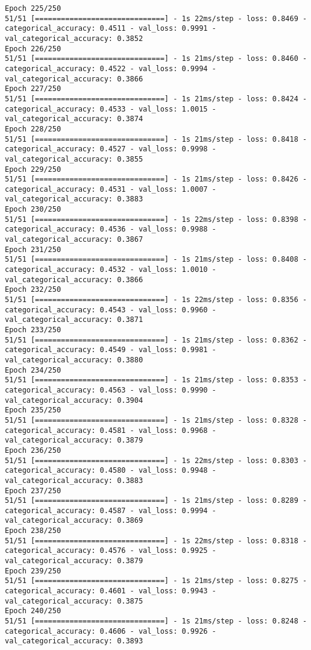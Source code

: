 \begin{lstlisting}
Epoch 225/250
51/51 [==============================] - 1s 22ms/step - loss: 0.8469 - categorical_accuracy: 0.4511 - val_loss: 0.9991 - val_categorical_accuracy: 0.3852
Epoch 226/250
51/51 [==============================] - 1s 21ms/step - loss: 0.8460 - categorical_accuracy: 0.4522 - val_loss: 0.9994 - val_categorical_accuracy: 0.3866
Epoch 227/250
51/51 [==============================] - 1s 21ms/step - loss: 0.8424 - categorical_accuracy: 0.4533 - val_loss: 1.0015 - val_categorical_accuracy: 0.3874
Epoch 228/250
51/51 [==============================] - 1s 21ms/step - loss: 0.8418 - categorical_accuracy: 0.4527 - val_loss: 0.9998 - val_categorical_accuracy: 0.3855
Epoch 229/250
51/51 [==============================] - 1s 21ms/step - loss: 0.8426 - categorical_accuracy: 0.4531 - val_loss: 1.0007 - val_categorical_accuracy: 0.3883
Epoch 230/250
51/51 [==============================] - 1s 22ms/step - loss: 0.8398 - categorical_accuracy: 0.4536 - val_loss: 0.9988 - val_categorical_accuracy: 0.3867
Epoch 231/250
51/51 [==============================] - 1s 21ms/step - loss: 0.8408 - categorical_accuracy: 0.4532 - val_loss: 1.0010 - val_categorical_accuracy: 0.3866
Epoch 232/250
51/51 [==============================] - 1s 22ms/step - loss: 0.8356 - categorical_accuracy: 0.4543 - val_loss: 0.9960 - val_categorical_accuracy: 0.3871
Epoch 233/250
51/51 [==============================] - 1s 21ms/step - loss: 0.8362 - categorical_accuracy: 0.4549 - val_loss: 0.9981 - val_categorical_accuracy: 0.3880
Epoch 234/250
51/51 [==============================] - 1s 21ms/step - loss: 0.8353 - categorical_accuracy: 0.4563 - val_loss: 0.9990 - val_categorical_accuracy: 0.3904
Epoch 235/250
51/51 [==============================] - 1s 21ms/step - loss: 0.8328 - categorical_accuracy: 0.4581 - val_loss: 0.9968 - val_categorical_accuracy: 0.3879
Epoch 236/250
51/51 [==============================] - 1s 22ms/step - loss: 0.8303 - categorical_accuracy: 0.4580 - val_loss: 0.9948 - val_categorical_accuracy: 0.3883
Epoch 237/250
51/51 [==============================] - 1s 21ms/step - loss: 0.8289 - categorical_accuracy: 0.4587 - val_loss: 0.9994 - val_categorical_accuracy: 0.3869
Epoch 238/250
51/51 [==============================] - 1s 22ms/step - loss: 0.8318 - categorical_accuracy: 0.4576 - val_loss: 0.9925 - val_categorical_accuracy: 0.3879
Epoch 239/250
51/51 [==============================] - 1s 21ms/step - loss: 0.8275 - categorical_accuracy: 0.4601 - val_loss: 0.9943 - val_categorical_accuracy: 0.3875
Epoch 240/250
51/51 [==============================] - 1s 21ms/step - loss: 0.8248 - categorical_accuracy: 0.4606 - val_loss: 0.9926 - val_categorical_accuracy: 0.3893

\end{lstlisting}
